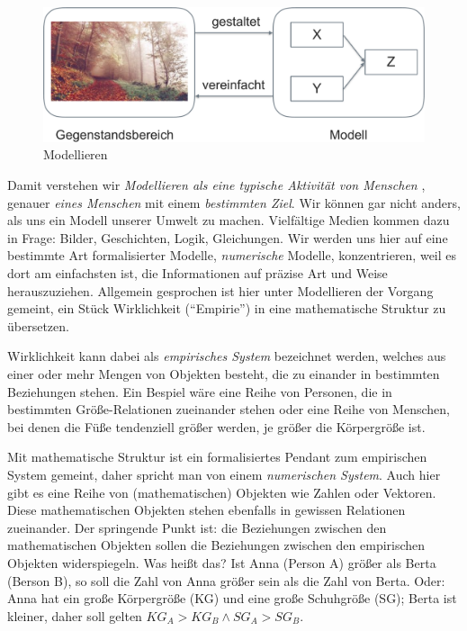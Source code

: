 \documentclass[12pt,ngerman,]{book}
\begin{document}
\begin{figure}

{\centering \includegraphics[width=0.7\linewidth]{images/Modell} 

}

\caption{Modellieren}\label{fig:modellieren-plot}
\end{figure}

Damit verstehen wir \emph{Modellieren als eine typische Aktivität von
Menschen} \citep{gigerenzer1980}, genauer \emph{eines Menschen} mit
einem \emph{bestimmten Ziel}. Wir können gar nicht anders, als uns ein
Modell unserer Umwelt zu machen. Vielfältige Medien kommen dazu in
Frage: Bilder, Geschichten, Logik, Gleichungen. Wir werden uns hier auf
eine bestimmte Art formalisierter Modelle, \emph{numerische} Modelle,
konzentrieren, weil es dort am einfachsten ist, die Informationen auf
präzise Art und Weise herauszuziehen. Allgemein gesprochen ist hier
unter Modellieren der Vorgang gemeint, ein Stück Wirklichkeit
(``Empirie'') in eine mathematische Struktur zu übersetzen.

Wirklichkeit kann dabei als \emph{empirisches System} bezeichnet werden,
welches aus einer oder mehr Mengen von Objekten besteht, die zu einander
in bestimmten Beziehungen stehen. Ein Bespiel wäre eine Reihe von
Personen, die in bestimmten Größe-Relationen zueinander stehen oder eine
Reihe von Menschen, bei denen die Füße tendenziell größer werden, je
größer die Körpergröße ist.

Mit mathematische Struktur ist ein formalisiertes Pendant zum
empirischen System gemeint, daher spricht man von einem
\emph{numerischen System}. Auch hier gibt es eine Reihe von
(mathematischen) Objekten wie Zahlen oder Vektoren. Diese mathematischen
Objekten stehen ebenfalls in gewissen Relationen zueinander. Der
springende Punkt ist: die Beziehungen zwischen den mathematischen
Objekten sollen die Beziehungen zwischen den empirischen Objekten
widerspiegeln. Was heißt das? Ist Anna (Person A) größer als Berta
(Berson B), so soll die Zahl von Anna größer sein als die Zahl von
Berta. Oder: Anna hat ein große Körpergröße (KG) und eine große
Schuhgröße (SG); Berta ist kleiner, daher soll gelten
\(KG_A > KG_B \wedge SG_A > SG_B\).
\end{document}
